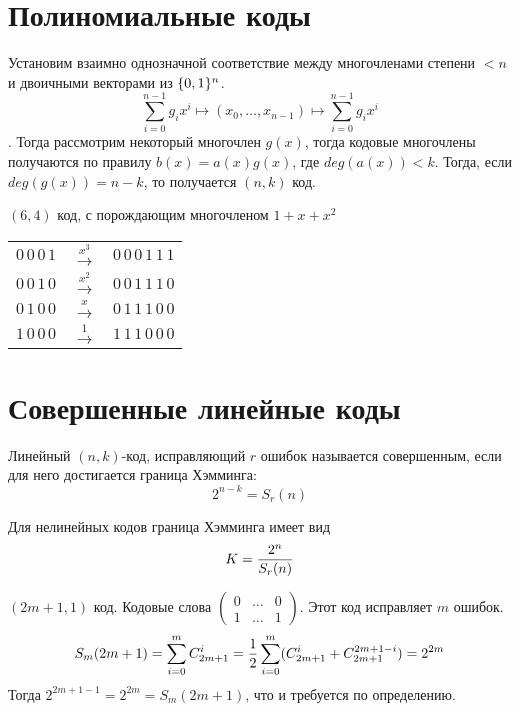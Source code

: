\section{Полиномиальные коды}

\begin{definition}
Установим взаимно однозначной соответствие между многочленами степени 
$< n$ и двоичными векторами из $\{0,1\}^n$. 
$$\sum\limits_{i=0}^{n-1} g_i x^i \mapsto (x_0, \ldots, x_{n-1})
 \mapsto \sum\limits_{i=0}^{n-1} g_i x^i$$.
Тогда рассмотрим некоторый многочлен $g(x)$, тогда кодовые многочлены
получаются по правилу $b(x) = a(x) g(x)$, где $deg(a(x)) < k$. Тогда,
если $deg(g(x)) = n-k$, то получается $(n,k)$ код.
\end{definition}

\begin{example}
 $(6,4)$ код, с порождающим многочленом $1 + x + x^2$
 
 \begin{tabular}{ccc}
  $0 \, 0 \, 0 \, 1$ & $\overset{x^3}{\to}$ & $0 \, 0 \, 0 \, 1 \, 1 \, 1$ \\
  $0 \, 0 \, 1 \, 0$ & $\overset{x^2}{\to}$ & $0 \, 0 \, 1 \, 1 \, 1 \, 0$ \\
  $0 \, 1 \, 0 \, 0$ & $\overset{x}{\to}$ & $0 \, 1 \, 1 \, 1 \, 0 \, 0$ \\
  $1 \, 0 \, 0 \, 0$ & $\overset{1}{\to}$ & $1 \, 1 \, 1 \, 0 \, 0 \, 0$ \\     
 \end{tabular}
\end{example}

\section{Совершенные линейные коды}

\begin{definition}
Линейный $(n,k)$-код, исправляющий $r$ ошибок называется совершенным, если для него
достигается граница Хэмминга:
$$2^{n-k} = S_r(n)$$
\end{definition}

\begin{remark}
Для нелинейных кодов граница Хэмминга имеет вид
$$K = {2^n \over S_r(n)}$$
\end{remark}

\begin{example}
$(2m+1,1)$ код. Кодовые слова $\begin{pmatrix} 0 & \ldots & 0 \\ 1 & \ldots & 1 \end{pmatrix}$.
Этот код исправляет $m$ ошибок.
$$S_m(2m+1) = \sum\limits_{i=0}^{m} C_{2m+1}^i = 
{1 \over 2} \sum\limits_{i=0}^{m} (C_{2m+1}^i + C_{2m+1}^{2m+1-i}) = 2^{2m}$$
Тогда $2^{2m+1 - 1} = 2^{2m} = S_m(2m+1)$, что и требуется по определению.
\end{example}

